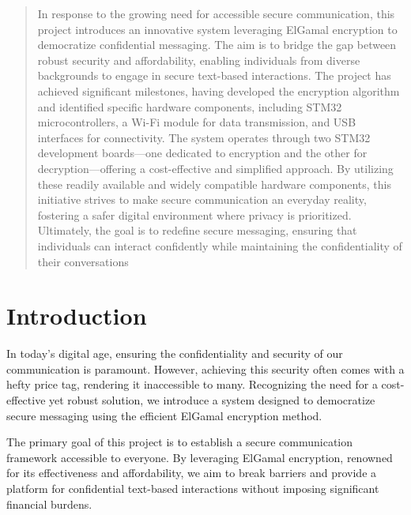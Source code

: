 \documentclass[12pt]{article}
\begin{document}
	
	
	\renewcommand{\abstractname}{Summary}
	\begin{abstract}
		In response to the growing need for accessible secure communication, this project introduces an innovative system leveraging ElGamal encryption to democratize confidential messaging. The aim is to bridge the gap between robust security and affordability, enabling individuals from diverse backgrounds to engage in secure text-based interactions. The project has achieved significant milestones, having developed the encryption algorithm and identified specific hardware components, including STM32 microcontrollers, a Wi-Fi module for data transmission, and USB interfaces for connectivity. The system operates through two STM32 development boards—one dedicated to encryption and the other for decryption—offering a cost-effective and simplified approach. By utilizing these readily available and widely compatible hardware components, this initiative strives to make secure communication an everyday reality, fostering a safer digital environment where privacy is prioritized. Ultimately, the goal is to redefine secure messaging, ensuring that individuals can interact confidently while maintaining the confidentiality of their conversations
		
	\end{abstract}
	

\clearpage %
	\section{Introduction}
In today's digital age, ensuring the confidentiality and security of our communication is paramount. However, achieving this security often comes with a hefty price tag, rendering it inaccessible to many. Recognizing the need for a cost-effective yet robust solution, we introduce a system designed to democratize secure messaging using the efficient ElGamal encryption method.

The primary goal of this project is to establish a secure communication framework accessible to everyone. By leveraging ElGamal encryption, renowned for its effectiveness and affordability, we aim to break barriers and provide a platform for confidential text-based interactions without imposing significant financial burdens.
\end{document}
